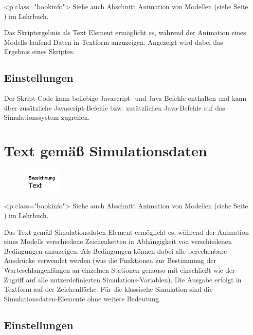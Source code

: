 <p class="bookinfo">
Siehe auch Abschnitt Animation von Modellen (siehe Seite \pageref{ref:book:5.4.3}) im Lehrbuch.

Das Skriptergebnis als Text Element ermöglicht es, während der Animation eines Modells laufend Daten in Textform anzuzeigen.
Angezeigt wird dabei das Ergebnis eines Skriptes.

\subsection*{Einstellungen}

Der Skript-Code kann beliebige Javascript- und Java-Befehle enthalten und kann über
zusätzliche Javascript-Befehle bzw. zusätzlichen Java-Befehle 
auf das Simulationssystem zugreifen.


\section{Text gemäß Simulationsdaten}
\label{ref:ModelElementAnimationTextSelect}

\begin{figure}
\vspace{-22pt}
\includegraphics[width=2cm]{imageModelElementAnimationTextSelect.png}
\vspace{-22pt}
\end{figure}

<p class="bookinfo">
Siehe auch Abschnitt Animation von Modellen (siehe Seite \pageref{ref:book:5.4.3}) im Lehrbuch.

Das Text gemäß Simulationsdaten Element ermöglicht es, während der Animation eines Modells verschiedene
Zeichenketten in Abhängigkeit von verschiedenen Bedingungen anzuzeigen. Als Bedingungen können dabei
alle berechenbare Ausdrücke verwendet werden (was die Funktionen zur Bestimmung der Warteschlangenlängen
an einzelnen Stationen genauso mit einschließt wie der Zugriff auf alle nutzerdefinierten Simulations-Variablen).
Die Ausgabe erfolgt in Textform auf der Zeichenfläche. Für die klassische Simulation sind die Simulationsdaten-Elemente
ohne weitere Bedeutung.

\subsection*{Einstellungen}

